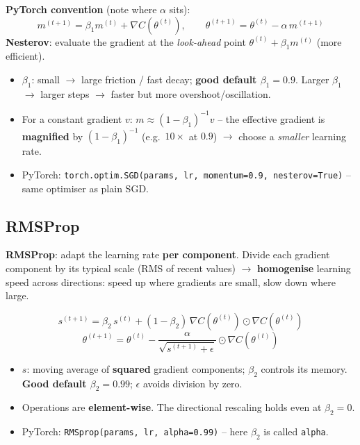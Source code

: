 \documentclass[10pt,a4paper]{article}
\begin{document}
	\begin{formulabox}
		\textbf{PyTorch convention} (note where $\alpha$ sits):
		\[
		m^{(t+1)} = \beta_1 m^{(t)} + \nabla C(\theta^{(t)}), \qquad
		\theta^{(t+1)} = \theta^{(t)} - \alpha\, m^{(t+1)}
		\]
		\textbf{Nesterov}: evaluate the gradient at the \emph{look-ahead} point $\theta^{(t)}+\beta_1 m^{(t)}$ (more efficient).
	\end{formulabox}
	\begin{itemize}[leftmargin=*]
		\item $\beta_1$: small $\rightarrow$ large friction / fast decay; \textbf{good default $\beta_1=0.9$}. Larger $\beta_1$ $\rightarrow$ larger steps $\rightarrow$ faster but more overshoot/oscillation.
		\item For a constant gradient $v$: $m \approx (1-\beta_1)^{-1} v$ -- the effective gradient is \textbf{magnified} by $(1-\beta_1)^{-1}$ (e.g.\ $10\times$ at $0.9$) $\rightarrow$ choose a \emph{smaller} learning rate.
		\item PyTorch: \texttt{torch.optim.SGD(params, lr, momentum=0.9, nesterov=True)} -- same optimiser as plain SGD.
	\end{itemize}

	\subsection{RMSProp}

	\begin{definitionbox}
		\textbf{RMSProp}: adapt the learning rate \textbf{per component}. Divide each gradient component by its typical scale (RMS of recent values) $\rightarrow$ \textbf{homogenise} learning speed across directions: speed up where gradients are small, slow down where large.
	\end{definitionbox}

	\begin{formulabox}
		\[
		s^{(t+1)} = \beta_2\, s^{(t)} + (1-\beta_2)\,\nabla C(\theta^{(t)}) \odot \nabla C(\theta^{(t)})
		\]
		\[
		\theta^{(t+1)} = \theta^{(t)} - \frac{\alpha}{\sqrt{s^{(t+1)}+\epsilon}} \odot \nabla C(\theta^{(t)})
		\]
	\end{formulabox}
	\begin{itemize}[leftmargin=*]
		\item $s$: moving average of \textbf{squared} gradient components; $\beta_2$ controls its memory. \textbf{Good default $\beta_2=0.99$}; $\epsilon$ avoids division by zero.
		\item Operations are \textbf{element-wise}. The directional rescaling holds even at $\beta_2=0$.
		\item PyTorch: \texttt{RMSprop(params, lr, alpha=0.99)} -- here $\beta_2$ is called \texttt{alpha}.
	\end{itemize}
\end{document}
